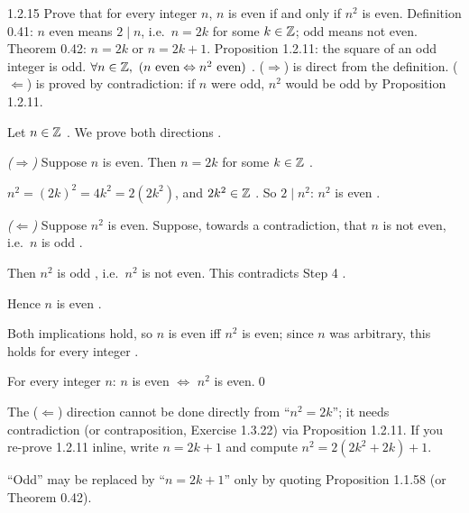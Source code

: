\begin{bookex}[essential]{1.2.15}
Prove that for every integer $n$, $n$ is even if and only if $n^2$ is even.
\solution
\given Definition 0.41: $n$ even means $2\mid n$, i.e.\ $n=2k$ for some $k\in\mathbb{Z}$; odd means not even. Theorem 0.42: $n=2k$ or $n=2k+1$. Proposition 1.2.11: the square of an odd integer is odd.
\goal $\forall n\in\mathbb{Z},\ (n\text{ even}\Leftrightarrow n^2\text{ even})$ .
\plan ($\Rightarrow$) is direct from the definition. ($\Leftarrow$) is proved by contradiction: if $n$ were odd, $n^2$ would be odd by Proposition 1.2.11.
\begin{steps}
\item Let $n\in\mathbb{Z}$ . We prove both directions .
\item \emph{($\Rightarrow$)} Suppose $n$ is even. Then $n=2k$ for some $k\in\mathbb{Z}$ .
\item $n^2=(2k)^2=4k^2=2(2k^2)$, and $2k^2\in\mathbb{Z}$ . So $2\mid n^2$: $n^2$ is even .
\item \emph{($\Leftarrow$)} Suppose $n^2$ is even. Suppose, towards a contradiction, that $n$ is not even, i.e.\ $n$ is odd .
\item Then $n^2$ is odd , i.e.\ $n^2$ is not even. This contradicts Step 4 .
\item Hence $n$ is even .
\item Both implications hold, so $n$ is even iff $n^2$ is even; since $n$ was arbitrary, this holds for every integer .
\end{steps}
\conclusion For every integer $n$: $n$ is even $\Leftrightarrow$ $n^2$ is even.\qed
\begin{compare}
\item The ($\Leftarrow$) direction cannot be done directly from ``$n^2=2k$''; it needs contradiction (or contraposition, Exercise 1.3.22) via Proposition 1.2.11. If you re-prove 1.2.11 inline, write $n=2k+1$ and compute $n^2=2(2k^2+2k)+1$.
\item ``Odd'' may be replaced by ``$n=2k+1$'' only by quoting Proposition 1.1.58 (or Theorem 0.42).
\end{compare}
\end{bookex}

